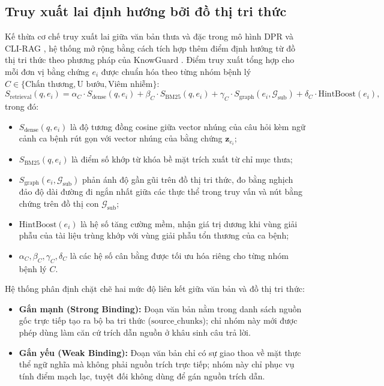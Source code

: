 \subsection{Truy xuất lai định hướng bởi đồ thị tri thức}
Kế thừa cơ chế truy xuất lai giữa văn bản thưa và đặc trong mô hình DPR \cite{karpukhin2020} và CLI-RAG \cite{clirag2024}, hệ thống mở rộng bằng cách tích hợp thêm điểm định hướng từ đồ thị tri thức theo phương pháp của KnowGuard \cite{knowguard2024}. Điểm truy xuất tổng hợp cho mỗi đơn vị bằng chứng $e_i$ được chuẩn hóa theo từng nhóm bệnh lý $C \in \{\text{Chấn thương}, \text{U bướu}, \text{Viêm nhiễm}\}$:
\begin{equation}
    S_{\mathrm{retrieval}}(q, e_i) = \alpha_C \cdot S_{\mathrm{dense}}(q, e_i) + \beta_C \cdot S_{\mathrm{BM25}}(q, e_i) + \gamma_C \cdot S_{\mathrm{graph}}(e_i, \mathcal{G}_{\mathrm{sub}}) + \delta_C \cdot \mathrm{HintBoost}(e_i),
\end{equation}
trong đó:
\begin{itemize}
    \item $S_{\mathrm{dense}}(q, e_i)$ là độ tương đồng cosine giữa vector nhúng của câu hỏi kèm ngữ cảnh ca bệnh rút gọn với vector nhúng của bằng chứng $\mathbf{z}_{e_i}$;
    \item $S_{\mathrm{BM25}}(q, e_i)$ là điểm số khớp từ khóa bề mặt trích xuất từ chỉ mục thưa;
    \item $S_{\mathrm{graph}}(e_i, \mathcal{G}_{\mathrm{sub}})$ phản ánh độ gần gũi trên đồ thị tri thức, đo bằng nghịch đảo độ dài đường đi ngắn nhất giữa các thực thể trong truy vấn và nút bằng chứng trên đồ thị con $\mathcal{G}_{\mathrm{sub}}$;
    \item $\mathrm{HintBoost}(e_i)$ là hệ số tăng cường mềm, nhận giá trị dương khi vùng giải phẫu của tài liệu trùng khớp với vùng giải phẫu tổn thương của ca bệnh;
    \item $\alpha_C, \beta_C, \gamma_C, \delta_C$ là các hệ số cân bằng được tối ưu hóa riêng cho từng nhóm bệnh lý $C$.
\end{itemize}

Hệ thống phân định chặt chẽ hai mức độ liên kết giữa văn bản và đồ thị tri thức:
\begin{itemize}
    \item \textbf{Gắn mạnh (Strong Binding):} Đoạn văn bản nằm trong danh sách nguồn gốc trực tiếp tạo ra bộ ba tri thức ($\mathrm{source\_chunks}$); chỉ nhóm này mới được phép dùng làm căn cứ trích dẫn nguồn ở khâu sinh câu trả lời.
    \item \textbf{Gắn yếu (Weak Binding):} Đoạn văn bản chỉ có sự giao thoa về mặt thực thể ngữ nghĩa mà không phải nguồn trích trực tiếp; nhóm này chỉ phục vụ tính điểm mạch lạc, tuyệt đối không dùng để gán nguồn trích dẫn.
\end{itemize}


